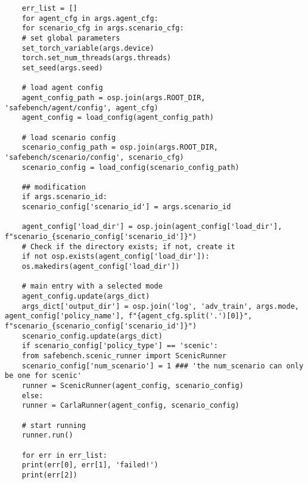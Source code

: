 \begin{lstlisting}
	err_list = []
	for agent_cfg in args.agent_cfg:
	for scenario_cfg in args.scenario_cfg:
	# set global parameters
	set_torch_variable(args.device)
	torch.set_num_threads(args.threads)
	set_seed(args.seed)
	
	# load agent config
	agent_config_path = osp.join(args.ROOT_DIR, 'safebench/agent/config', agent_cfg)
	agent_config = load_config(agent_config_path)
	
	# load scenario config
	scenario_config_path = osp.join(args.ROOT_DIR, 'safebench/scenario/config', scenario_cfg)
	scenario_config = load_config(scenario_config_path)
	
	## modification
	if args.scenario_id:
	scenario_config['scenario_id'] = args.scenario_id
	
	agent_config['load_dir'] = osp.join(agent_config['load_dir'], f"scenario_{scenario_config['scenario_id']}")
	# Check if the directory exists; if not, create it
	if not osp.exists(agent_config['load_dir']):
	os.makedirs(agent_config['load_dir'])        
	
	# main entry with a selected mode
	agent_config.update(args_dict)
	args_dict['output_dir'] = osp.join('log', 'adv_train', args.mode, agent_config['policy_name'], f"{agent_cfg.split('.')[0]}", f"scenario_{scenario_config['scenario_id']}")
	scenario_config.update(args_dict)
	if scenario_config['policy_type'] == 'scenic':
	from safebench.scenic_runner import ScenicRunner
	scenario_config['num_scenario'] = 1 ### 'the num_scenario can only be one for scenic'
	runner = ScenicRunner(agent_config, scenario_config)
	else:
	runner = CarlaRunner(agent_config, scenario_config)
	
	# start running
	runner.run()
	
	for err in err_list:
	print(err[0], err[1], 'failed!')
	print(err[2])
\end{lstlisting}




